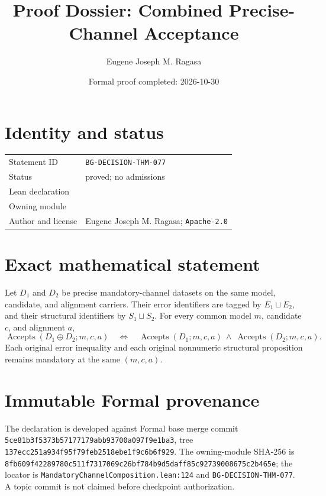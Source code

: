 \documentclass[10pt]{article}
\title{Proof Dossier: Combined Precise-Channel Acceptance}
\author{Eugene Joseph M. Ragasa}
\date{Formal proof completed: 2026-10-30}
\begin{document}
\raggedright
\maketitle
\section{Identity and status}
\begin{tabularx}{\textwidth}{@{}lY@{}}
\toprule
Statement ID & \texttt{BG-DECISION-THM-077} \\
Status & proved; no admissions \\
Lean declaration &  \\
Owning module &  \\
Author and license & Eugene Joseph M. Ragasa; \texttt{Apache-2.0} \\
\bottomrule
\end{tabularx}

\section{Exact mathematical statement}
Let $D_1$ and $D_2$ be precise mandatory-channel datasets on the same model, candidate, and
alignment carriers. Their error identifiers are tagged by $E_1\sqcup E_2$, and their structural
identifiers by $S_1\sqcup S_2$. For every common model $m$, candidate $c$, and alignment $a$,
\[
 \operatorname{Accepts}(D_1\mathbin{\oplus}D_2;m,c,a)
 \quad\Longleftrightarrow\quad
 \operatorname{Accepts}(D_1;m,c,a)\ \land\
 \operatorname{Accepts}(D_2;m,c,a).
\]
Each original error inequality and each original nonnumeric structural proposition remains
mandatory at the same $(m,c,a)$.

\section{Immutable Formal provenance}
The declaration is developed against Formal base merge commit
\texttt{5ce81b3f5373b57177179abb93700a097f9e1ba3}, tree
\texttt{137ecc251a934f95f79feb2518ebe1f9c6b6f929}. The owning-module SHA-256 is
\texttt{8fb609f42289780c511f7317069c26bf784b9d5daff85c92739008675c2b465e}; the locator is
\texttt{MandatoryChannelComposition.lean:124} and \texttt{BG-DECISION-THM-077}. A topic commit
is not claimed before checkpoint authorization.
\end{document}
